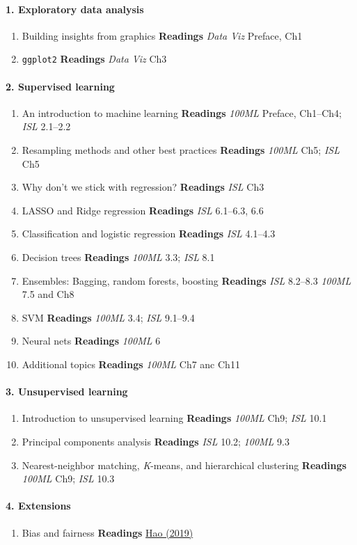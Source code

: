 \documentclass[10pt]{article}
\begin{document}
\paragraph{1. Exploratory data analysis}
\begin{enumerate}
  \item Building insights from graphics \textbf{Readings} \textit{Data Viz} Preface, Ch1
  \item \texttt{ggplot2} \textbf{Readings} \textit{Data Viz} Ch3
\end{enumerate}

\paragraph{2. Supervised learning}
\begin{enumerate}
  \item An introduction to machine learning \textbf{Readings} \textit{100ML} Preface, Ch1--Ch4; \textit{ISL} 2.1--2.2
  \item Resampling methods and other best practices \textbf{Readings} \textit{100ML} Ch5; \textit{ISL} Ch5
  \item Why don't we stick with regression? \textbf{Readings} \textit{ISL} Ch3
  \item LASSO and Ridge regression \textbf{Readings} \textit{ISL} 6.1--6.3, 6.6
  \item Classification and logistic regression \textbf{Readings} \textit{ISL} 4.1--4.3
  \item Decision trees \textbf{Readings} \textit{100ML} 3.3; \textit{ISL} 8.1
  \item Ensembles: Bagging, random forests, boosting \textbf{Readings} \textit{ISL} 8.2--8.3 \textit{100ML} 7.5 and Ch8
  \item SVM \textbf{Readings} \textit{100ML} 3.4; \textit{ISL} 9.1--9.4
  \item Neural nets \textbf{Readings} \textit{100ML} 6
  \item Additional topics \textbf{Readings} \textit{100ML} Ch7 anc Ch11
\end{enumerate}

\paragraph{3. Unsupervised learning}
\begin{enumerate}
  \item Introduction to unsupervised learning \textbf{Readings} \textit{100ML} Ch9; \textit{ISL} 10.1
  \item Principal components analysis \textbf{Readings} \textit{ISL} 10.2; \textit{100ML} 9.3
  \item Nearest-neighbor matching, \textit{K}-means, and hierarchical clustering \textbf{Readings} \textit{100ML} Ch9; \textit{ISL} 10.3
\end{enumerate}

\paragraph{4. Extensions}
\begin{enumerate}
  \item Bias and fairness \textbf{Readings} \href{https://www.technologyreview.com/s/612876/this-is-how-ai-bias-really-happensand-why-its-so-hard-to-fix/}{Hao (2019)}
\end{enumerate}
\end{document}
